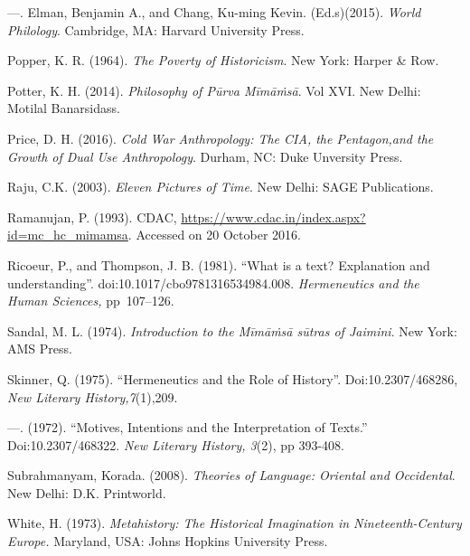 \begin{thebibliography}{99}
  —. Elman, Benjamin A., and Chang, Ku-ming Kevin. (Ed.s)(2015). \textit{World Philology}. Cambridge, MA: Harvard University Press.

  Popper, K. R. (1964). \textit{The Poverty of Historicism}. New York: Harper \& Row.

  Potter, K. H. (2014). \textit{Philosophy of Pūrva Mīmāṁsā}. Vol XVI. New Delhi: Motilal Banarsidass.

  Price, D. H. (2016). \textit{Cold War Anthropology: The CIA, the Pentagon,and the Growth of Dual Use Anthropology}. Durham, NC: Duke Unversity Press.

  Raju, C.K. (2003). \textit{Eleven Pictures of Time}. New Delhi: SAGE Publications.

  Ramanujan, P. (1993). CDAC, \url{https://www.cdac.in/index.aspx?id=mc_hc_mimamsa}. Accessed on 20 October 2016.

  Ricoeur, P., and Thompson, J. B. (1981). “What is a text? Explanation and understanding”. doi:10.1017/cbo9781316534984.008. \textit{Hermeneutics and the Human Sciences,} pp~107--126.

  Sandal, M. L. (1974). \textit{Introduction to the Mīmāṁsā sūtras of Jaimini}. New York: AMS Press.

  Skinner, Q. (1975). “Hermeneutics and the Role of History”. Doi:10.2307/468286, \textit{New Literary History,7}(1),209.

  —. (1972). “Motives, Intentions and the Interpretation of Texts.” Doi:10.2307/468322. \textit{New Literary History, 3}(2), pp 393-408.

  Subrahmanyam, Korada. (2008). \textit{Theories of Language: Oriental and Occidental}. New Delhi: D.K. Printworld.

  White, H. (1973). \textit{Metahistory: The Historical Imagination in Nineteenth-Century Europe.} Maryland, USA: Johns Hopkins University Press.

 \end{thebibliography}

\theendnotes

